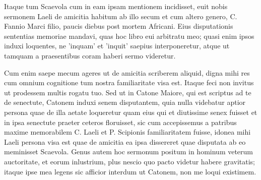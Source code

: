 \documentclass[a4paper]{book}
\begin{document}
\pstart%
    Itaque tum Scaevola cum in eam ipsam mentionem incidisset, euit nobis sermonem Laeli de amicitia habitum ab illo secum et cum altero genero, C. Fannio Marci filio, paucis diebus post mortem Africani. Eius disputationis sententias memoriae mandavi, quas hoc libro eui arbitratu meo; quasi enim ipsos induxi loquentes, ne 'inquam' et 'inquit' saepius interponeretur, atque ut tamquam a praesentibus coram haberi sermo videretur.%
\pend

\pstart%
    Cum enim saepe mecum ageres ut de amicitia scriberem aliquid, digna mihi res cum omnium cognitione tum nostra familiaritate visa est. Itaque feci non invitus ut prodessem multis rogatu tuo. Sed ut in Catone Maiore, qui est scriptus ad te de senectute, Catonem induxi senem disputantem, quia nulla videbatur aptior persona quae de illa aetate loqueretur quam eius qui et diutissime senex fuisset et in ipsa senectute praeter ceteros floruisset, sic cum accepissemus a patribus maxime memorabilem C. Laeli et P. Scipionis familiaritatem fuisse, idonea mihi Laeli persona visa est quae de amicitia ea ipsa dissereret quae disputata ab eo meminisset Scaevola. Genus autem hoc sermonum positum in hominum veterum auctoritate, et eorum inlustrium, plus nescio quo pacto videtur habere gravitatis; itaque ipse mea legens sic afficior interdum ut Catonem, non me loqui existimem.%
\pend

\endnumbering
\end{document}
